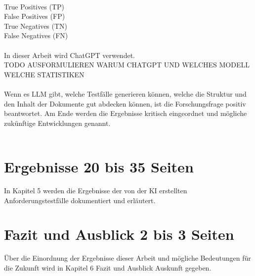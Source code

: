 \documentclass[12pt,toc=bib,toc=listof]{scrreprt}
\begin{document}
\\
True Positives (TP)\\
False Positives (FP)\\
True Negatives (TN)\\ 
False Negatives (FN)\\
\\
In dieser Arbeit wird ChatGPT verwendet.\\
TODO AUSFORMULIEREN WARUM CHATGPT UND WELCHES MODELL WELCHE STATISTIKEN\\
\\
Wenn es LLM gibt, welche Testfälle generieren können, welche die Struktur und den Inhalt der Dokumente gut abdecken können, ist die Forschungsfrage positiv beantwortet. Am Ende werden die Ergebnisse kritisch eingeordnet und mögliche zukünftige Entwicklungen genannt.\\
\\

\chapter{Ergebnisse 20 bis 35 Seiten} %
\label{sec:ergebnisse}
In Kapitel 5 werden die Ergebnisse der von der KI erstellten Anforderungstestfälle dokumentiert und erläutert.


\chapter{Fazit und Ausblick 2 bis 3 Seiten} %
\label{sec:fazit_und_ausblick}
Über die Einordnung der Ergebnisse dieser Arbeit und mögliche Bedeutungen für die Zukunft wird in Kapitel 6 Fazit und Ausblick Auskunft gegeben.

\printbibliography
\newpage
\end{document}
